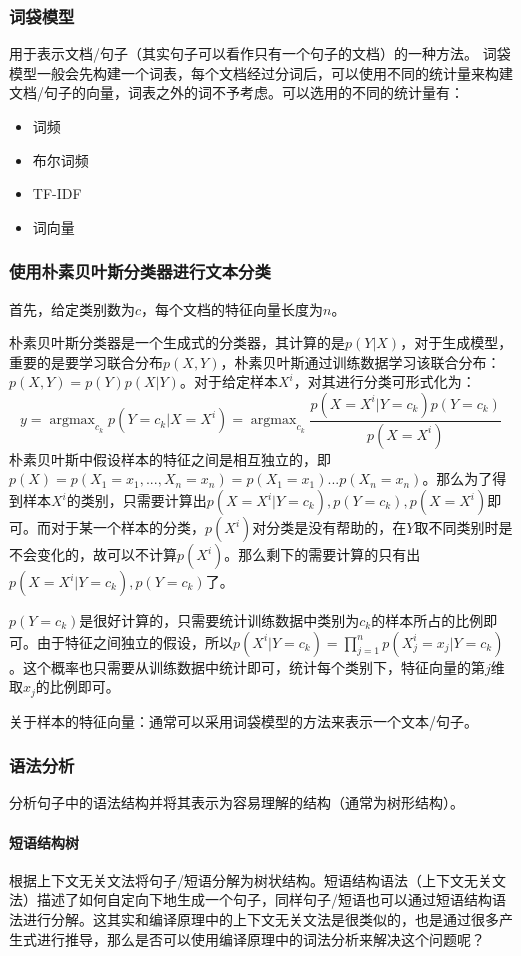 \subsubsection{词袋模型}
用于表示文档/句子（其实句子可以看作只有一个句子的文档）的一种方法。
词袋模型一般会先构建一个词表，每个文档经过分词后，可以使用不同的统计量来构建文档/句子的向量，词表之外的词不予考虑。可以选用的不同的统计量有：
\begin{itemize}
	\item 词频
	\item 布尔词频
	\item TF-IDF
	\item 词向量
\end{itemize}

\subsubsection{使用朴素贝叶斯分类器进行文本分类}
首先，给定类别数为$c$，每个文档的特征向量长度为$n$。

朴素贝叶斯分类器是一个生成式的分类器，其计算的是$p(Y | X)$，对于生成模型，重要的是要学习联合分布$p(X, Y)$，朴素贝叶斯通过训练数据学习该联合分布：$p(X, Y) = p(Y)p(X|Y)$。对于给定样本$X^i$，对其进行分类可形式化为：
$$
y = \mathop{argmax}_{c_k} p(Y=c_k | X=X^i) = \mathop{argmax}_{c_k} \frac{p(X=X^i | Y=c_k) p(Y=c_k)}{p(X=X^i)}
$$
朴素贝叶斯中假设样本的特征之间是相互独立的，即$p(X)=p(X_1=x_1, ..., X_n=x_n) = p(X_1=x_1) ... p(X_n=x_n)$。那么为了得到样本$X^i$的类别，只需要计算出$p(X=X^i | Y=c_k),  p(Y=c_k), p(X=X^i)$即可。而对于某一个样本的分类，$p(X^i)$对分类是没有帮助的，在$Y$取不同类别时是不会变化的，故可以不计算$p(X^i)$。那么剩下的需要计算的只有出$p(X=X^i | Y=c_k),  p(Y=c_k)$了。

$p(Y=c_k)$是很好计算的，只需要统计训练数据中类别为$c_k$的样本所占的比例即可。由于特征之间独立的假设，所以$p(X^i | Y=c_k) = \prod_{j=1}^{n} p(X_{j}^{i}=x_j | Y=c_k)$。这个概率也只需要从训练数据中统计即可，统计每个类别下，特征向量的第$j$维取$x_j$的比例即可。

关于样本的特征向量：通常可以采用词袋模型的方法来表示一个文本/句子。

\subsubsection{语法分析}
分析句子中的语法结构并将其表示为容易理解的结构（通常为树形结构）。
\paragraph{短语结构树}根据上下文无关文法将句子/短语分解为树状结构。短语结构语法（上下文无关文法）描述了如何自定向下地生成一个句子，同样句子/短语也可以通过短语结构语法进行分解。这其实和编译原理中的上下文无关文法是很类似的，也是通过很多产生式进行推导，那么是否可以使用编译原理中的词法分析来解决这个问题呢？

